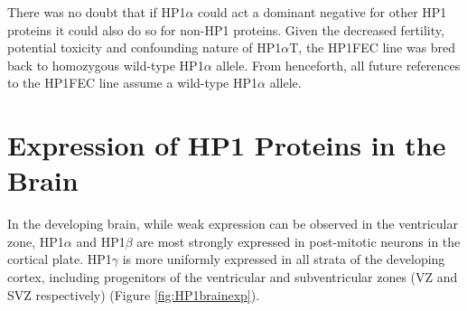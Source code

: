 \documentclass[onehalf,12pt]{beavtex}
\begin{document}
  There was no doubt that if HP1\(\alpha\) could act a dominant negative
  for other HP1 proteins it could also do so for non-HP1 proteins. Given
  the decreased fertility, potential toxicity and confounding nature of
  HP1\(\alpha\)T, the HP1FEC line was bred back to homozygous wild-type
  HP1\(\alpha\) allele. From henceforth, all future references to the
  HP1FEC line assume a wild-type HP1\(\alpha\) allele. \FloatBarrier
  \clearpage
  
  \section{Expression of HP1 Proteins in the
  Brain}\label{expression-of-hp1-proteins-in-the-brain}
  
  In the developing brain, while weak expression can be observed in the
  ventricular zone, HP1\(\alpha\) and HP1\(\beta\) are most strongly
  expressed in post-mitotic neurons in the cortical plate. HP1\(\gamma\)
  is more uniformly expressed in all strata of the developing cortex,
  including progenitors of the ventricular and subventricular zones (VZ
  and SVZ respectively) (Figure \ref{fig:HP1brainexp}).
  
\end{document}
